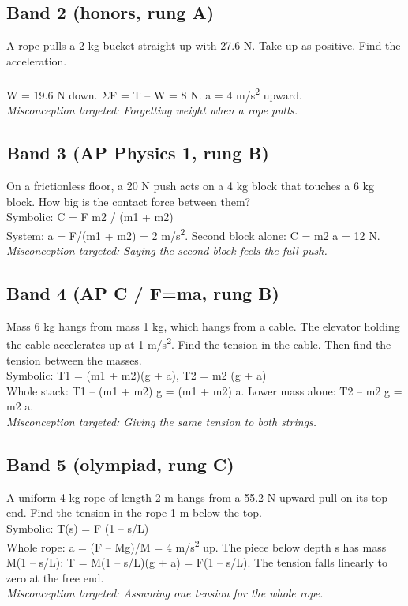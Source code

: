 \documentclass[11pt]{article}
\begin{document}
\subsection*{Band 2 (honors, rung A)}
\noindent A rope pulls a 2 kg bucket straight up with 27.6 N. Take up as positive. Find the acceleration.\\ \\ W = 19.6 N down. $\Sigma$F = T -- W = 8 N. a = 4 m/s\textsuperscript{2} upward.\\ \textit{Misconception targeted: Forgetting weight when a rope pulls.}\par
\subsection*{Band 3 (AP Physics 1, rung B)}
\noindent On a frictionless floor, a 20 N push acts on a 4 kg block that touches a 6 kg block. How big is the contact force between them?\\  \quad Symbolic: C = F m2 / (m1 + m2)\\ System: a = F/(m1 + m2) = 2 m/s\textsuperscript{2}. Second block alone: C = m2 a = 12 N.\\ \textit{Misconception targeted: Saying the second block feels the full push.}\par
\subsection*{Band 4 (AP C / F=ma, rung B)}
\noindent Mass 6 kg hangs from mass 1 kg, which hangs from a cable. The elevator holding the cable accelerates up at 1 m/s\textsuperscript{2}. Find the tension in the cable. Then find the tension between the masses.\\  \quad Symbolic: T1 = (m1 + m2)(g + a),  T2 = m2 (g + a)\\ Whole stack: T1 -- (m1 + m2) g = (m1 + m2) a. Lower mass alone: T2 -- m2 g = m2 a.\\ \textit{Misconception targeted: Giving the same tension to both strings.}\par
\subsection*{Band 5 (olympiad, rung C)}
\noindent A uniform 4 kg rope of length 2 m hangs from a 55.2 N upward pull on its top end. Find the tension in the rope 1 m below the top.\\  \quad Symbolic: T(s) = F (1 -- s/L)\\ Whole rope: a = (F -- Mg)/M = 4 m/s\textsuperscript{2} up. The piece below depth s has mass M(1 -- s/L): T = M(1 -- s/L)(g + a) = F(1 -- s/L). The tension falls linearly to zero at the free end.\\ \textit{Misconception targeted: Assuming one tension for the whole rope.}\par
\end{document}
